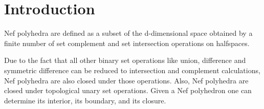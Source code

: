 \ccParDims






\minitoc

\section{Introduction}

Nef polyhedra are defined as a subset of the d-dimensional space obtained by
a finite number of set complement and set intersection operations on
halfspaces. 

Due to the fact that all other binary set operations like union,
difference and symmetric difference can be reduced to intersection and
complement calculations, Nef polyhedra are also closed under those
operations. Also, Nef polyhedra are closed under topological unary 
set operations. Given a Nef polyhedron one can determine its interior, its
boundary, and its closure.

